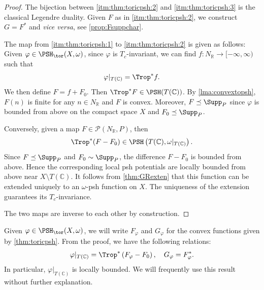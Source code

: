 \begin{proof}
The bijection between \ref{itm:thm:toricpsh:2} and \ref{itm:thm:toricpsh:3} is the classical Legendre duality. Given $F$ as in \ref{itm:thm:toricpsh:2}, we construct $G=F^*$ and \emph{vice versa}, see \cref{prop:Fsuppchar}.

The map from \ref{itm:thm:toricpsh:1} to \ref{itm:thm:toricpsh:2} is given as follows: Given $\varphi\in \PSH_{\tor}(X,\omega)$, since $\varphi$ is $T_c$-invariant, we can find $f\colon N_{\mathbb{R}}\rightarrow [-\infty,\infty)$ such that
\begin{equation}\label{ex:varphitropf}
\varphi|_{T(\mathbb{C})}=\Trop^*f.
\end{equation}
We then define $F=f+F_0$. Then $\Trop^* F\in \PSH(T(\mathbb{C}))$.
By \cref{lma:convextopsh}, $F(n)$ is finite for any $n\in N_{\mathbb{R}}$ and $F$ is convex. Moreover, $F\preceq \Supp_P$ since $\varphi$ is bounded from above on the compact space $X$ and $F_0\preceq \Supp_P$.

Conversely, given a map $F\in \mathcal{P}(N_{\mathbb{R}},P)$, then
\[
\Trop^*(F-F_0)\in \PSH\left(T(\mathbb{C}),\omega|_{T(\mathbb{C})}\right).
\]
Since $F\preceq \Supp_P$ and $F_0\sim \Supp_P$, the difference $F-F_0$ is bounded from above. Hence the corresponding local psh potentials are locally bounded from above near $X\setminus T(\mathbb{C})$. It follows from \cref{thm:GRexten} that this function can be extended uniquely to an $\omega$-psh function on $X$. The uniqueness of the extension guarantees its $T_c$-invariance.

The two maps are inverse to each other by construction.
\end{proof}


Given $\varphi\in \PSH_{\tor}(X,\omega)$, we will write $F_{\varphi}$ and $G_{\varphi}$ for the convex functions given by \cref{thm:toricpsh}. From the proof, we have the following relations:
\begin{equation}\label{eq:FvarphidefGdef}
\varphi|_{T(\mathbb{C})}=\Trop^*\left(F_{\varphi}-F_0\right),\quad G_{\varphi}=F_{\varphi}^*.
\end{equation}
In particular, $\varphi|_{T(\mathbb{C})}$ is locally bounded. We will frequently use this result without further explanation.

